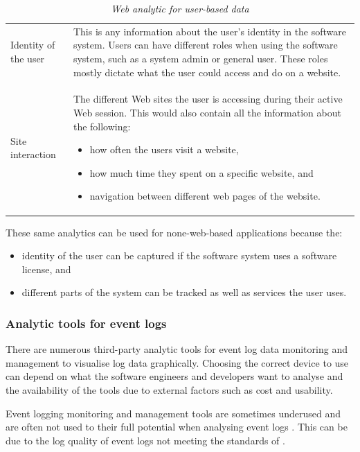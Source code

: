 \begin{table}[!htb]
	\centering
	\caption[Web analytic for user-based data]
	{\textit{Web analytic for user-based data}}
	\label{tbl:ch1_webAnalytics}
	\begin{tabularx}{\textwidth}{lX}
		\toprule 
		\thead{Analytic}  & \thead{Description} \\
		\midrule

		\rowcolor{lightgray}
		Identity of the user & This is any information about the user's identity in the software system. Users can have different roles when using the software system, such as a system admin or general user. These roles mostly dictate what the user could access and do on a website. \\

		Site interaction & The different Web sites the user is accessing during their active Web session. This would also contain all the information about the following: 
		\begin{itemize}
			\item how often the users visit a website,
			\item how much time they spent on a specific website, and
			\item navigation between different web pages of the website.
		\end{itemize}
		\\
		\bottomrule
	\end{tabularx}
\end{table}

These same analytics can be used for none-web-based applications because the: 
\begin{itemize}
	\item identity of the user can be captured if the software system uses a software license, and
	\item different parts of the system can be tracked as well as services the user uses.
\end{itemize} 

\subsubsection{Analytic tools for event logs}
There are numerous third-party analytic tools for event log data monitoring and management to visualise log data graphically. Choosing the correct device to use can depend on what the software engineers and developers want to analyse and the availability of the tools due to external factors such as cost and usability. \par Event logging monitoring and management tools are sometimes underused and are often not used to their full potential when analysing event logs \cite{Fedaghi2010}. This can be due to the log quality of event logs not meeting the standards of . 

